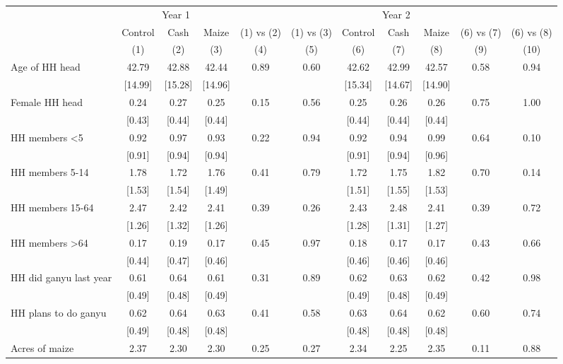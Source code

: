 \begin{tabular}{l cc cc cc cc cc}
\hline
 & \multicolumn{3}{c}{Year 1} & & & \multicolumn{3}{c}{Year 2} & & \\
 & Control & Cash & Maize & (1) vs (2) & (1) vs (3) & Control & Cash & Maize & (6) vs (7) & (6) vs (8) \\
 & (1) & (2) & (3) & (4) & (5) & (6) & (7) & (8) & (9) & (10) \\ 
\hline
Age of HH head & 42.79    & 42.88    & 42.44    & 0.89 & 0.60 & 42.62    & 42.99    & 42.57    & 0.58 & 0.94 \\ 
 & [14.99] & [15.28] & [14.96] & & & [15.34] & [14.67] & [14.90] & & \\ 
Female HH head & 0.24     & 0.27     & 0.25     & 0.15 & 0.56 & 0.25     & 0.26     & 0.26     & 0.75 & 1.00 \\ 
 & [0.43] & [0.44] & [0.44] & & & [0.44] & [0.44] & [0.44] & & \\ 
HH members <5 & 0.92     & 0.97     & 0.93     & 0.22 & 0.94 & 0.92     & 0.94     & 0.99     & 0.64 & 0.10 \\ 
 & [0.91] & [0.94] & [0.94] & & & [0.91] & [0.94] & [0.96] & & \\ 
HH members 5-14 & 1.78     & 1.72     & 1.76     & 0.41 & 0.79 & 1.72     & 1.75     & 1.82     & 0.70 & 0.14 \\ 
 & [1.53] & [1.54] & [1.49] & & & [1.51] & [1.55] & [1.53] & & \\ 
HH members 15-64 & 2.47     & 2.42     & 2.41     & 0.39 & 0.26 & 2.43     & 2.48     & 2.41     & 0.39 & 0.72 \\ 
 & [1.26] & [1.32] & [1.26] & & & [1.28] & [1.31] & [1.27] & & \\ 
HH members >64 & 0.17     & 0.19     & 0.17     & 0.45 & 0.97 & 0.18     & 0.17     & 0.17     & 0.43 & 0.66 \\ 
 & [0.44] & [0.47] & [0.46] & & & [0.46] & [0.46] & [0.46] & & \\ 
HH did ganyu last year & 0.61     & 0.64     & 0.61     & 0.31 & 0.89 & 0.62     & 0.63     & 0.62     & 0.42 & 0.98 \\ 
 & [0.49] & [0.48] & [0.49] & & & [0.49] & [0.48] & [0.49] & & \\ 
HH plans to do ganyu & 0.62     & 0.64     & 0.63     & 0.41 & 0.58 & 0.63     & 0.64     & 0.62     & 0.60 & 0.74 \\ 
 & [0.49] & [0.48] & [0.48] & & & [0.48] & [0.48] & [0.48] & & \\ 
Acres of maize & 2.37     & 2.30     & 2.30     & 0.25 & 0.27 & 2.34     & 2.25     & 2.35     & 0.11 & 0.88 \\ 

\end{tabular}
